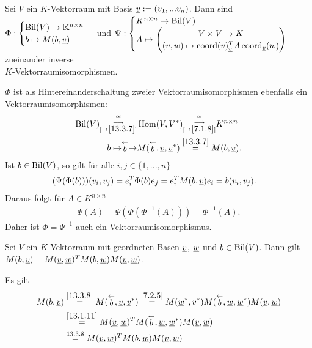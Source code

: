 \documentclass[../../main.tex]{subfiles}
\begin{document}
\begin{sat}\label{13.3.9}
Sei $V$ ein $K$-Vektorraum mit Basis ${\underline v}:=(v_1,...v_n)$. Dann sind\\ $\Phi:\begin{cases}\operatorname{Bil}(V)\to \mathbb K^{n\times n}\\ b\mapsto M(b,{\underline v})\end{cases}$ und $\Psi: \begin{cases}K^{n\times n}\to \Bil(V)\\A\mapsto\begin{pmatrix*}V\times V\to K\\ (v,w)\mapsto \co(v)_{\v}^TA\co_\v(w)\end{pmatrix*}\end{cases}$ zueinander inverse\\ $K$-Vektorraumisomorphismen.
\end{sat}
\begin{cproof} $\Phi$ ist als Hintereinanderschaltung zweier Vektorraumisomorphismen ebenfalls ein Vektorraumisomorphismen:
\begin{align*}
\operatorname{Bil}(V)\substack{\cong\\\longrightarrow\\ [\to\ref{13.3.7}]}&\operatorname{Hom}(V,V^*)\substack{\cong\\\longrightarrow\\ [\to\ref{7.1.8}]}K^{n\times n}\\
b\mapsto\stackrel{\leftarrow}{b}\mapsto &M(\stackrel{\leftarrow}{b},{\underline v},{\underline v}^*)\stackrel{\ref{13.3.7}}{=}M(b,{\underline v}).
\end{align*}
Ist $b\in \operatorname{Bil}(V)$, so gilt für alle $i,j\in\{1,...,n\}$
\begin{align*}
	(\Psi(\Phi(b)))(v_i,v_j)&=e_i^T\Phi(b)e_j=e_i^TM(b,{\underline v})e_i=b(v_i,v_j).
\end{align*}
Daraus folgt für $A\in K^{n\times n}$
\begin{align*}
	\Psi(A)=\Psi(\Phi(\Phi^{-1}(A)))=\Phi^{-1}(A).
\end{align*}
Daher ist $\Phi=\Psi^{-1}$ auch ein Vektorraumisomorphismus.
\end{cproof}

\begin{sat}\label{13.3.10}
Sei $V$ ein $K$-Vektorraum mit geordneten Basen ${\underline v}$, ${\underline w}$ und $b\in \operatorname{Bil}(V)$. Dann gilt $M(b,{\underline v})=M({\underline v},{\underline w})^TM(b,{\underline w})M({\underline v},{\underline w})$.
\end{sat}
\begin{cproof} Es gilt
\begin{align*}
M(b,{\underline v})&\stackrel{\ref{13.3.8}}{=}M(\stackrel{\leftarrow}{b}, {\underline v},{\underline v}^*)\stackrel{\ref{7.2.5}}{=}M({\underline w}^*,v^*)M(\stackrel{\leftarrow}{b},{\underline w},{\underline w}^*)M({\underline v},{\underline w})\\
&\stackrel{\ref{13.1.11}}{=}M({\underline v},{\underline w})^TM(\stackrel{\leftarrow}{b},{\underline w},{\underline w}^*)M({\underline v},{\underline w})\\
&\stackrel{13.3.8}{=}M({\underline v},{\underline w})^TM(b,{\underline w})M({\underline v},{\underline w})
\end{align*}
\end{cproof}
\end{document}
